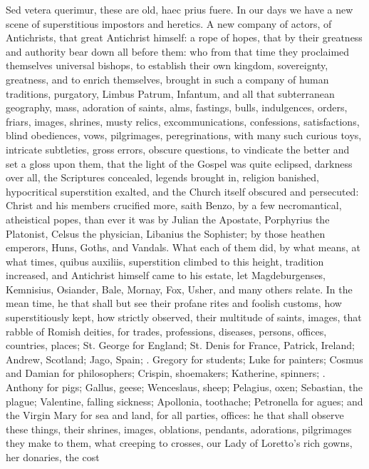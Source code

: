 {Sed vetera querimur, these are old, haec prius fuere. In our days we
have a new scene of superstitious impostors and heretics. A new company
of actors, of Antichrists, that great Antichrist himself: a rope of
hopes, that by their greatness and authority bear down all before them:
who from that time they proclaimed themselves universal bishops, to
establish their own kingdom, sovereignty, greatness, and to enrich
themselves, brought in such a company of human traditions, purgatory,
Limbus Patrum, Infantum, and all that subterranean geography, mass,
adoration of saints, alms, fastings, bulls, indulgences, orders,
friars, images, shrines, musty relics, excommunications, confessions,
satisfactions, blind obediences, vows, pilgrimages, peregrinations,
with many such curious toys, intricate subtleties, gross errors,
obscure questions, to vindicate the better and set a gloss upon them,
that the light of the Gospel was quite eclipsed, darkness over all, the
Scriptures concealed, legends brought in, religion banished,
hypocritical superstition exalted, and the Church itself 
obscured and persecuted: Christ and his members crucified more, saith
Benzo, by a few necromantical, atheistical popes, than ever it was by
 Julian the Apostate, Porphyrius the Platonist, Celsus the
physician, Libanius the Sophister; by those heathen emperors, Huns,
Goths, and Vandals. What each of them did, by what means, at what
times, quibus auxiliis, superstition climbed to this height, tradition
increased, and Antichrist himself came to his estate, let
Magdeburgenses, Kemnisius, Osiander, Bale, Mornay, Fox, Usher, and many
others relate. In the mean time, he that shall but see their profane
rites and foolish customs, how superstitiously kept, how strictly
observed, their multitude of saints, images, that rabble of Romish
deities, for trades, professions, diseases, persons, offices,
countries, places; St. George for England; St. Denis for France,
Patrick, Ireland; Andrew, Scotland; Jago, Spain; \etc{}. Gregory for
students; Luke for painters; Cosmus and Damian for philosophers;
Crispin, shoemakers; Katherine, spinners; \etc{}. Anthony for pigs; Gallus,
geese; Wenceslaus, sheep; Pelagius, oxen; Sebastian, the plague;
Valentine, falling sickness; Apollonia, toothache; Petronella for
agues; and the Virgin Mary for sea and land, for all parties, offices:
he that shall observe these things, their shrines, images, oblations,
pendants, adorations, pilgrimages they make to them, what creeping to
crosses, our Lady of Loretto's rich gowns, her donaries, the cost
}

